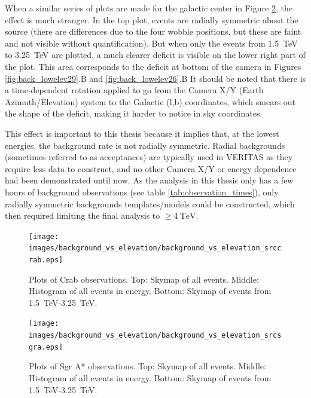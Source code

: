   When a similar series of plots are made for the galactic center in Figure \ref{fig:bkgvsel_sgra}, the effect is much stronger.
  In the top plot, events are radially symmetric about the source (there are differences due to the four wobble positions, but these are faint and not visible without quantification).
  But when only the events from \SI{1.5}{\TeV} to \SI{3.25}{\TeV} are plotted, a much clearer deficit is visible on the lower right part of the plot.
  This area corresponds to the deficit at bottom of the camera in Figures \ref{fig:back_lowelev29}.B and \ref{fig:back_lowelev26}.B
  It should be noted that there is a time-dependent rotation applied to go from the Camera X/Y (Earth Azimuth/Elevation) system to the Galactic (l,b) coordinates, which smears out the shape of the deficit, making it harder to notice in sky coordinates.
  
  This effect is important to this thesis because it implies that, at the lowest energies, the background rate is not radially symmetric.
  Radial backgrounds (sometimes referred to as acceptances) are typically used in VERITAS as they require less data to construct, and no other Camera X/Y or energy dependence had been demonstrated until now.
  As the analysis in this thesis only has a few hours of background observations (see table \ref{tab:observation_times}), only radially symmetric backgrounds templates/models could be constructed, which then required limiting the final analysis to $\geq\SI{4}{\TeV}$.
  
  \begin{figure}[ht]
    \centering
    \texttt{[image: images/background\_vs\_elevation/background\_vs\_elevation\_srccrab.eps]}
    \caption[Background Vs Elevation Crab]
    {\small 
      Plots of Crab observations.
      Top: Skymap of all events.
      Middle: Histogram of all events in energy.
      Bottom: Skymap of events from \SI{1.5}{\TeV}-\SI{3.25}{\TeV}.  
    }
    \label{fig:bkgvsel_crab}
  \end{figure}

  \begin{figure}[ht]
    \centering
    \texttt{[image: images/background\_vs\_elevation/background\_vs\_elevation\_srcsgra.eps]}
    \caption[Background Vs Elevation Sgr A*]
    {\small 
      Plots of Sgr A* observations.
      Top: Skymap of all events.
      Middle: Histogram of all events in energy.
      Bottom: Skymap of events from \SI{1.5}{\TeV}-\SI{3.25}{\TeV}.  
    }
    \label{fig:bkgvsel_sgra}
  \end{figure}

